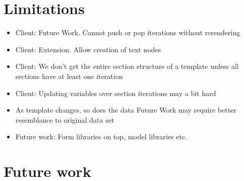 \documentclass[thesis.tex]{subfiles}
\begin{document}
\section{Limitations}
\begin{itemize}
	\item Client: Future Work. Cannot push or pop iterations without rerendering
	\item Client: Extension. Allow creation of text nodes
	\item Client: We don't get the entire section structure of a template unless all
	      sections have at least one iteration
	\item Client: Updating variables over section iterations may a bit hard
	\item As template changes, so does the data
	      Future Work may require better resemblance to original data set
	\item Future work: Form libraries on top, model libraries etc.
\end{itemize}
\section{Future work}
\end{document}
